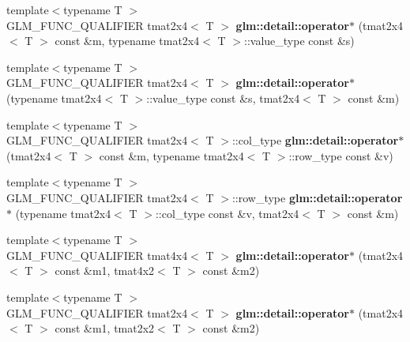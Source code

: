 \begin{DoxyCompactItemize}
\item 
\hypertarget{namespaceglm_1_1detail_af770a5a4723b5dce1e66a7e315a851e4}{}{\footnotesize template$<$typename T $>$ }\\G\+L\+M\+\_\+\+F\+U\+N\+C\+\_\+\+Q\+U\+A\+L\+I\+F\+I\+E\+R tmat2x4$<$ T $>$ {\bfseries glm\+::detail\+::operator$\ast$} (tmat2x4$<$ T $>$ const \&m, typename tmat2x4$<$ T $>$\+::value\+\_\+type const \&s)\label{namespaceglm_1_1detail_af770a5a4723b5dce1e66a7e315a851e4}

\item 
\hypertarget{namespaceglm_1_1detail_abbfcc88b6c615da805a3974036d51cde}{}{\footnotesize template$<$typename T $>$ }\\G\+L\+M\+\_\+\+F\+U\+N\+C\+\_\+\+Q\+U\+A\+L\+I\+F\+I\+E\+R tmat2x4$<$ T $>$ {\bfseries glm\+::detail\+::operator$\ast$} (typename tmat2x4$<$ T $>$\+::value\+\_\+type const \&s, tmat2x4$<$ T $>$ const \&m)\label{namespaceglm_1_1detail_abbfcc88b6c615da805a3974036d51cde}

\item 
\hypertarget{namespaceglm_1_1detail_ab9e94def233a4d8905775fcdb8132008}{}{\footnotesize template$<$typename T $>$ }\\G\+L\+M\+\_\+\+F\+U\+N\+C\+\_\+\+Q\+U\+A\+L\+I\+F\+I\+E\+R tmat2x4$<$ T $>$\+::col\+\_\+type {\bfseries glm\+::detail\+::operator$\ast$} (tmat2x4$<$ T $>$ const \&m, typename tmat2x4$<$ T $>$\+::row\+\_\+type const \&v)\label{namespaceglm_1_1detail_ab9e94def233a4d8905775fcdb8132008}

\item 
\hypertarget{namespaceglm_1_1detail_a741bf58af36b55b9320191e61efdb804}{}{\footnotesize template$<$typename T $>$ }\\G\+L\+M\+\_\+\+F\+U\+N\+C\+\_\+\+Q\+U\+A\+L\+I\+F\+I\+E\+R tmat2x4$<$ T $>$\+::row\+\_\+type {\bfseries glm\+::detail\+::operator$\ast$} (typename tmat2x4$<$ T $>$\+::col\+\_\+type const \&v, tmat2x4$<$ T $>$ const \&m)\label{namespaceglm_1_1detail_a741bf58af36b55b9320191e61efdb804}

\item 
\hypertarget{namespaceglm_1_1detail_afe1d0397afae94fe4913a1ba2b583f43}{}{\footnotesize template$<$typename T $>$ }\\G\+L\+M\+\_\+\+F\+U\+N\+C\+\_\+\+Q\+U\+A\+L\+I\+F\+I\+E\+R tmat4x4$<$ T $>$ {\bfseries glm\+::detail\+::operator$\ast$} (tmat2x4$<$ T $>$ const \&m1, tmat4x2$<$ T $>$ const \&m2)\label{namespaceglm_1_1detail_afe1d0397afae94fe4913a1ba2b583f43}

\item 
\hypertarget{namespaceglm_1_1detail_a5a2715c0f6e95bd02de87a034b56d5e3}{}{\footnotesize template$<$typename T $>$ }\\G\+L\+M\+\_\+\+F\+U\+N\+C\+\_\+\+Q\+U\+A\+L\+I\+F\+I\+E\+R tmat2x4$<$ T $>$ {\bfseries glm\+::detail\+::operator$\ast$} (tmat2x4$<$ T $>$ const \&m1, tmat2x2$<$ T $>$ const \&m2)\label{namespaceglm_1_1detail_a5a2715c0f6e95bd02de87a034b56d5e3}


\end{DoxyCompactItemize}
